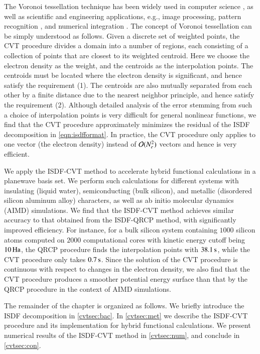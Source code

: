 The Voronoi tessellation technique has been widely used in computer science
\cite{aurenhammer1991voronoi}, as well as scientific and engineering
applications, e.g., image processing\cite{du2006centroidal}, pattern
recognition \cite{ogniewicz1995hierarchic}, and numerical integration 
\cite{becke1988multicenter}. The concept of Voronoi tessellation can be simply
understood as follows. Given a discrete set of weighted points, the CVT
procedure divides a domain  into a number of regions, each consisting of a
collection of points that are closest to its weighted centroid. Here we choose
the electron density as the weight, and the centroids as the interpolation
points. The centroids must be located where the electron density is significant,
and hence satisfy the requirement (1). The centroids are also mutually separated
from each other by a finite distance due to the nearest neighbor principle, and
hence satisfy the requirement (2). Although detailed analysis of the error
stemming from such a choice of interpolation points is very difficult for
general nonlinear functions, we find that the CVT procedure approximately
minimizes the residual of the ISDF decomposition in \cref{eqn:isdfformat}.
In practice, the CVT procedure only applies to one vector (the electron density)
instead of $\mathcal{O}(N_{e}^2)$ vectors and hence is very efficient.

We apply the ISDF\hyp{}CVT method to accelerate hybrid functional calculations
in a planewave basis set. We perform such calculations for different systems
with insulating (liquid water), semiconducting (bulk silicon), and metallic 
(disordered silicon aluminum alloy) characters, as well as ab initio molecular
dynamics (AIMD) simulations. We find that the ISDF\hyp{}CVT method achieves
similar accuracy to that obtained from the ISDF\hyp{}QRCP method, with
significantly improved efficiency. For instance, for a bulk silicon system
containing $1000$ silicon atoms computed on $2000$ computational cores with
kinetic energy cutoff being $10\operatorname{Ha}$, the QRCP procedure finds the interpolation
points with $38.1\operatorname{s}$, while the CVT procedure only takes $0.7\operatorname{s}$. Since the
solution of the CVT procedure is continuous with respect to changes in the
electron density, we also find that the CVT procedure produces a smoother
potential energy surface than that by the QRCP procedure in the context of AIMD
simulations.

The remainder of the chapter is organized as follows. We briefly introduce the
ISDF decomposition in \cref{cvtsec:bac}. In \cref{cvtsec:met} we describe
the ISDF\hyp{}CVT procedure and its implementation for hybrid functional
calculations. We present numerical results of the ISDF\hyp{}CVT method in 
\cref{cvtsec:num}, and conclude in \cref{cvtsec:con}.